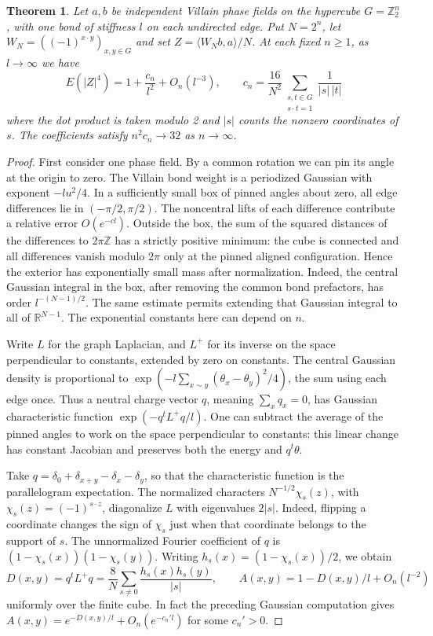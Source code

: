 \documentclass[11pt,a4paper]{article}
\newtheorem{thm}{Theorem}[section]
\theoremstyle{remark}
\begin{document}
\begin{samepage}
\begin{thm}\label{thm:hypercube}
Let $a,b$ be independent Villain phase fields on the hypercube $G=\mathbb Z_2^n$, with one bond of stiffness $l$ on each undirected edge. Put $N=2^n$, let $W_N=((-1)^{x\cdot y})_{x,y\in G}$ and set $Z=\langle W_N b,a\rangle/N$. At each fixed $n\ge1$, as $l\to\infty$ we have
\[
 E(|Z|^4)=1+\frac{c_n}{l^2}+O_n(l^{-3}),\qquad
 c_n=\frac{16}{N^2}\sum_{\substack{s,t\in G\\s\cdot t=1}}\frac{1}{|s|\,|t|}
\]
where the dot product is taken modulo 2 and $|s|$ counts the nonzero coordinates of $s$. The coefficients satisfy $n^2c_n\to32$ as $n\to\infty$.
\end{thm}
\end{samepage}

\begin{proof}
First consider one phase field. By a common rotation we can pin its angle at the origin to zero. The Villain bond weight is a periodized Gaussian with exponent $-l u^2/4$. In a sufficiently small box of pinned angles about zero, all edge differences lie in $(-\pi/2,\pi/2)$. The noncentral lifts of each difference contribute a relative error $O(e^{-c l})$. Outside the box, the sum of the squared distances of the differences to $2\pi\mathbb Z$ has a strictly positive minimum: the cube is connected and all differences vanish modulo $2\pi$ only at the pinned aligned configuration. Hence the exterior has exponentially small mass after normalization. Indeed, the central Gaussian integral in the box, after removing the common bond prefactors, has order $l^{-(N-1)/2}$. The same estimate permits extending that Gaussian integral to all of $\mathbb R^{N-1}$. The exponential constants here can depend on $n$.

Write $L$ for the graph Laplacian, and $L^+$ for its inverse on the space perpendicular to constants, extended by zero on constants. The central Gaussian density is proportional to $\exp(-l\sum_{x\sim y}(\theta_x-\theta_y)^2/4)$, the sum using each edge once. Thus a neutral charge vector $q$, meaning $\sum_x q_x=0$, has Gaussian characteristic function $\exp(-q^tL^+q/l)$. One can subtract the average of the pinned angles to work on the space perpendicular to constants: this linear change has constant Jacobian and preserves both the energy and $q^t\theta$.

Take $q=\delta_0+\delta_{x+y}-\delta_x-\delta_y$, so that the characteristic function is the parallelogram expectation. The normalized characters $N^{-1/2}\chi_s(z)$, with $\chi_s(z)=(-1)^{s\cdot z}$, diagonalize $L$ with eigenvalues $2|s|$. Indeed, flipping a coordinate changes the sign of $\chi_s$ just when that coordinate belongs to the support of $s$. The unnormalized Fourier coefficient of $q$ is $(1-\chi_s(x))(1-\chi_s(y))$. Writing $h_s(x)=(1-\chi_s(x))/2$, we obtain
\[
 D(x,y)=q^tL^+q=\frac8N\sum_{s\ne0}\frac{h_s(x)h_s(y)}{|s|},
 \qquad A(x,y)=1-D(x,y)/l+O_n(l^{-2})
\]
uniformly over the finite cube. In fact the preceding Gaussian computation gives $A(x,y)=e^{-D(x,y)/l}+O_n(e^{-c_n' l})$ for some $c_n'>0$.


\end{proof}
\end{document}
